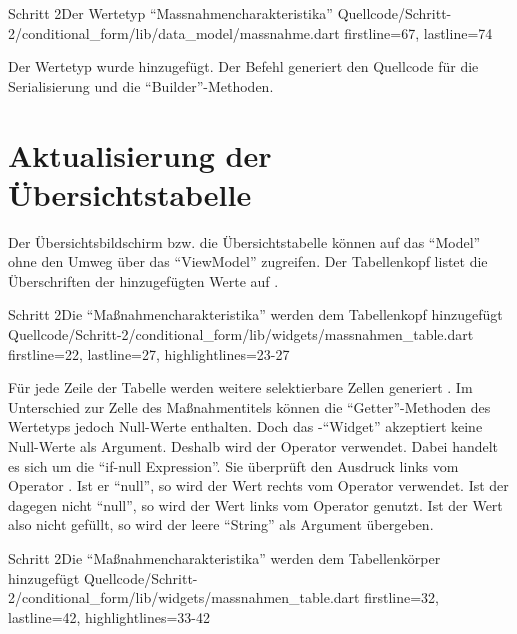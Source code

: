 \begin{alexlisting}{Schritt 2}{Der Wertetyp \enquote{Massnahmencharakteristika}}
  {Quellcode/Schritt-2/conditional_form/lib/data_model/massnahme.dart}
  {firstline=67, lastline=74}
  \label{lst:Schritt2WerteTypMassnahmencharakteristika}
\end{alexlisting}

Der Wertetyp wurde hinzugefügt.
Der Befehl  generiert den Quellcode für die Serialisierung und die \enquote{Builder}-Methoden.

\section{Aktualisierung der Übersichtstabelle}

Der Übersichtsbildschirm bzw. die Übersichtstabelle können auf das \enquote{Model} ohne den Umweg über das \enquote{ViewModel} zugreifen.
Der Tabellenkopf listet die Überschriften der hinzugefügten Werte auf .

\begin{alexlisting}{Schritt 2}{Die \enquote{Maßnahmencharakteristika} werden dem Tabellenkopf hinzugefügt}
  {Quellcode/Schritt-2/conditional_form/lib/widgets/massnahmen_table.dart}
  {firstline=22, lastline=27, highlightlines={23-27}}
  \label{lst:Schritt2MassnahmencharakteristikaEerdenDemTabellenkopfHinzugefuegt}
\end{alexlisting}

Für jede Zeile der Tabelle werden weitere selektierbare Zellen generiert .
Im Unterschied zur Zelle des Maßnahmentitels können die \enquote{Getter}-Methoden des Wertetyps  jedoch Null-Werte enthalten.
Doch das -\enquote{Widget} akzeptiert keine Null-Werte als Argument.
Deshalb wird der Operator  verwendet. Dabei handelt es sich um die \enquote{if-null Expression}. 
Sie überprüft den Ausdruck links vom Operator . Ist er \enquote{null}, so wird der Wert rechts vom Operator verwendet.
Ist der dagegen nicht \enquote{null}, so wird der Wert links vom Operator  genutzt.
 Ist der Wert also nicht gefüllt, so wird der leere \enquote{String}  als Argument übergeben.

\begin{alexlisting}{Schritt 2}{Die \enquote{Maßnahmencharakteristika} werden dem Tabellenkörper hinzugefügt}
  {Quellcode/Schritt-2/conditional_form/lib/widgets/massnahmen_table.dart}
  {firstline=32, lastline=42, highlightlines={33-42}}
  \label{lst:Schritt2MassnahmencharakteristikaWerdenDemTabellenkoerperHinzugefuegt}
\end{alexlisting}

